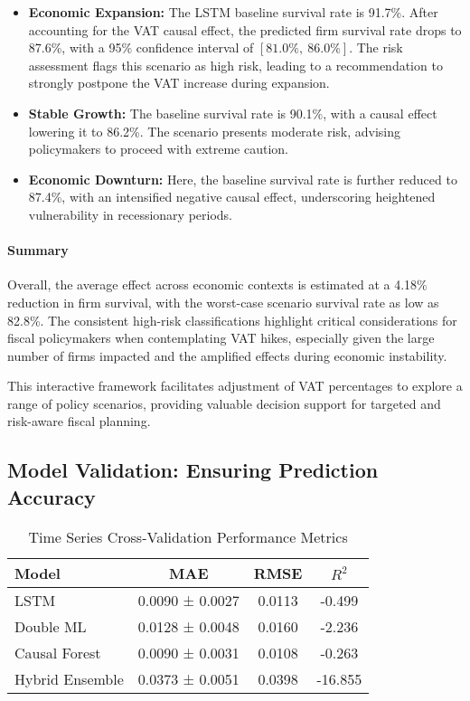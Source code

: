\begin{itemize}
    \item \textbf{Economic Expansion:} The LSTM baseline survival rate is 91.7\%. After accounting for the VAT causal effect, the predicted firm survival rate drops to 87.6\%, with a 95\% confidence interval of $[81.0\%,\ 86.0\%]$. The risk assessment flags this scenario as high risk, leading to a recommendation to strongly postpone the VAT increase during expansion.
    \item \textbf{Stable Growth:} The baseline survival rate is 90.1\%, with a causal effect lowering it to 86.2\%. The scenario presents moderate risk, advising policymakers to proceed with extreme caution.
    \item \textbf{Economic Downturn:} Here, the baseline survival rate is further reduced to 87.4\%, with an intensified negative causal effect, underscoring heightened vulnerability in recessionary periods.
\end{itemize}

\paragraph{Summary}
Overall, the average effect across economic contexts is estimated at a 4.18\% reduction in firm survival, with the worst-case scenario survival rate as low as 82.8\%. The consistent high-risk classifications highlight critical considerations for fiscal policymakers when contemplating VAT hikes, especially given the large number of firms impacted and the amplified effects during economic instability.

This interactive framework facilitates adjustment of VAT percentages to explore a range of policy scenarios, providing valuable decision support for targeted and risk-aware fiscal planning.

\subsection{Model Validation: Ensuring Prediction Accuracy}

\begin{table}[H]
\centering
\small
\caption{Time Series Cross-Validation Performance Metrics}
\label{tab:cross_val_perf}
\begin{tabular}{|l|c|c|c|}
\hline
\textbf{Model} & \textbf{MAE} & \textbf{RMSE} & \textbf{\( R^2 \)} \\
\hline
LSTM            & 0.0090 ± 0.0027 & 0.0113 & -0.499 \\
Double ML       & 0.0128 ± 0.0048 & 0.0160 & -2.236 \\
Causal Forest   & 0.0090 ± 0.0031 & 0.0108 & -0.263 \\
Hybrid Ensemble & 0.0373 ± 0.0051 & 0.0398 & -16.855 \\
\hline
\end{tabular}
\end{table}

